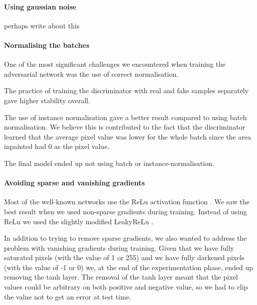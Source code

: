 \paragraph{Using gaussian noise}
perhaps write about this



\paragraph{Normalising the batches}
One of the most significant challenges we encountered when training the adversarial network was the use of correct normalisation. 

The practice of training the discriminator with real and fake samples separately gave higher stability overall. 

The use of instance normalisation gave a better result compared to using batch normalisation. We believe this is contributed to the fact that the discriminator learned that the average pixel value was lower for the whole batch since the area inpainted had 0 as the pixel value.

The final model ended up not using batch or instance-normalisation. 



\paragraph{Avoiding sparse and vanishing gradients}
Most of the well-known networks use the ReLu\cite{Nair/2010/RLU/3104322.3104425} activation function \cite{DBLP:journals/corr/SimonyanZ14a} \cite{DBLP:journals/corr/SzegedyIV16} 
\cite{DBLP:journals/corr/HeZRS15}.
We saw the best result when we used non-sparse gradients during training. 
Instead of using ReLu we used the slightly modified LeakyReLu \cite{Maas2013RectifierNI}.


In addition to trying to remove sparse gradients, we also wanted to address the problem with vanishing gradients during training. Given that we have fully saturated pixels (with the value of 1 or 255) and we have fully darkened pixels (with the value of -1 or 0) we, at the end of the experimentation phase, ended up removing the tanh layer. 
The removal of the tanh layer meant that the pixel values could be arbitrary on both positive and negative value, so we had to clip the value not to get an error at test time. 




